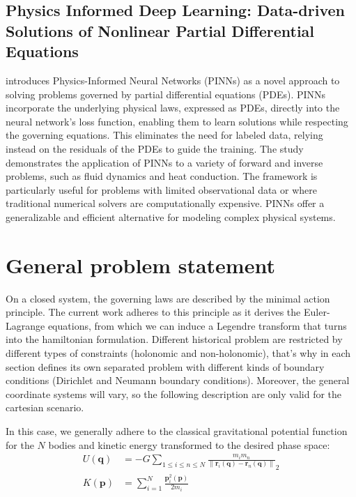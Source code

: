 \documentclass[draft]{agujournal2019}
\newcommand{\norm}[1]{\left\lVert#1\right\rVert}
\begin{document}
\subsection{Physics Informed Deep Learning: Data-driven Solutions of Nonlinear Partial Differential Equations}
\cite{raissi2017physicsinformeddeeplearning} introduces Physics-Informed Neural Networks (PINNs) as a novel approach to solving problems governed by partial differential equations (PDEs). PINNs incorporate the underlying physical laws, expressed as PDEs, directly into the neural network's loss function, enabling them to learn solutions while respecting the governing equations. This eliminates the need for labeled data, relying instead on the residuals of the PDEs to guide the training. The study demonstrates the application of PINNs to a variety of forward and inverse problems, such as fluid dynamics and heat conduction. The framework is particularly useful for problems with limited observational data or where traditional numerical solvers are computationally expensive. PINNs offer a generalizable and efficient alternative for modeling complex physical systems.

\section{General problem statement}
On a closed system, the governing laws are described by the minimal action principle. The current work adheres to this principle as it derives the Euler-Lagrange equations, from which we can induce a Legendre transform that turns into the hamiltonian formulation. Different historical problem are restricted by different types of constraints (holonomic and non-holonomic), that's why in each section defines its own separated problem with different kinds of boundary conditions (Dirichlet and Neumann boundary conditions). Moreover, the general coordinate systems will vary, so the following description are only valid for the cartesian scenario.

In this case, we generally adhere to the classical gravitational potential function for the $N$ bodies and kinetic energy transformed to the desired phase space:
\begin{align}
    U(\mathbf{q}) &= - G \sum_{1 \leq i \leq n \leq N} \frac{m_i m_n}{\norm{\mathbf{r}_i\left(\mathbf{q}\right) - \mathbf{r}_n\left(\mathbf{q}\right)}}_2 \\
    K(\mathbf{p}) &= \sum_{i = 1}^{N} \frac{\mathbf{p}_i^2\left(\mathbf{p}\right)}{2 m_i}
\end{align}
\end{document}
